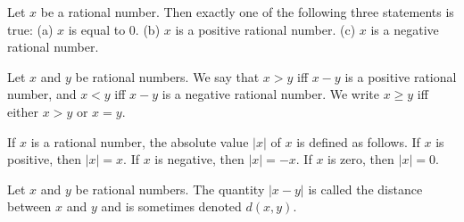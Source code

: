 \documentclass[nobib,notoc]{tufte-handout}
\begin{document}
\begin{defi}
	Let \(x\) be a rational number. Then exactly one of the following three statements is true: (a) \(x\) is equal to \(0\). (b) \(x\) is a positive rational number. (c) \(x\) is a negative rational number.
\end{defi}
\begin{defi}
	Let \(x\) and \(y\) be rational numbers. We say that \(x>y\) iff \(x-y\) is a positive rational number, and \(x<y\) iff \(x-y\) is a negative rational number. We write \(x\geq y\) iff either \(x>y\) or \(x=y\).
\end{defi}
\begin{defi}
	If \(x\) is a rational number, the absolute value \(\lvert x\rvert\) of \(x\) is defined as follows. If \(x\) is positive, then \(\lvert x\rvert=x\). If \(x\) is negative, then \(\lvert x\rvert=-x\). If \(x\) is zero, then \(\lvert x\rvert=0\).
\end{defi}
\begin{defi}[Distance]
	Let \(x\) and \(y\) be rational numbers. The quantity \(\lvert x-y\rvert\) is called the distance between \(x\) and \(y\) and is sometimes denoted \(d(x,y)\).
\end{defi}
\end{document}
